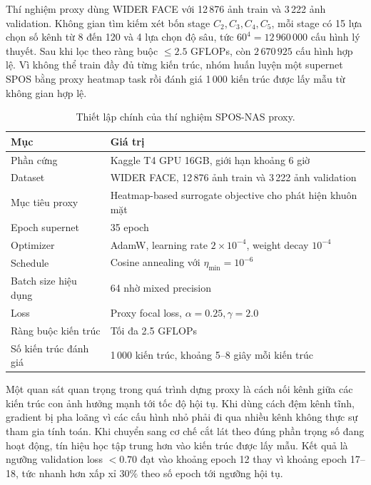 
Thí nghiệm proxy dùng WIDER FACE với 12\,876 ảnh train và 3\,222 ảnh validation. Không gian tìm kiếm xét bốn stage \(C_2,C_3,C_4,C_5\), mỗi stage có 15 lựa chọn số kênh từ 8 đến 120 và 4 lựa chọn độ sâu, tức \(60^4=12\,960\,000\) cấu hình lý thuyết. Sau khi lọc theo ràng buộc \(\leq 2.5\) GFLOPs, còn \(2\,670\,925\) cấu hình hợp lệ. Vì không thể train đầy đủ từng kiến trúc, nhóm huấn luyện một supernet SPOS bằng proxy heatmap task rồi đánh giá 1\,000 kiến trúc được lấy mẫu từ không gian hợp lệ.

\begin{table}[H]
\centering
\caption{Thiết lập chính của thí nghiệm SPOS-NAS proxy.}
\small
\begin{tabular}{@{}p{}p{}@{}}
\toprule
\textbf{Mục} & \textbf{Giá trị} \\
\midrule
Phần cứng & Kaggle T4 GPU 16GB, giới hạn khoảng 6 giờ \\
\midrule
Dataset & WIDER FACE, 12\,876 ảnh train và 3\,222 ảnh validation \\
\midrule
Mục tiêu proxy & Heatmap-based surrogate objective cho phát hiện khuôn mặt \\
\midrule
Epoch supernet & 35 epoch \\
\midrule
Optimizer & AdamW, learning rate \(2\times10^{-4}\), weight decay \(10^{-4}\) \\
\midrule
Schedule & Cosine annealing với \(\eta_{\min}=10^{-6}\) \\
\midrule
Batch size hiệu dụng & 64 nhờ mixed precision \cite{micikevicius2018mixed} \\
\midrule
Loss & Proxy focal loss, \(\alpha=0.25,\gamma=2.0\) \\
\midrule
Ràng buộc kiến trúc & Tối đa 2.5 GFLOPs \\
\midrule
Số kiến trúc đánh giá & 1\,000 kiến trúc, khoảng 5--8 giây mỗi kiến trúc \\
\bottomrule
\end{tabular}
\end{table}

Một quan sát quan trọng trong quá trình dựng proxy là cách nối kênh giữa các kiến trúc con ảnh hưởng mạnh tới tốc độ hội tụ. Khi dùng cách đệm kênh tĩnh, gradient bị pha loãng vì các cấu hình nhỏ phải đi qua nhiều kênh không thực sự tham gia tính toán. Khi chuyển sang cơ chế cắt lát theo đúng phần trọng số đang hoạt động, tín hiệu học tập trung hơn vào kiến trúc được lấy mẫu. Kết quả là ngưỡng validation loss \(<0.70\) đạt vào khoảng epoch 12 thay vì khoảng epoch 17--18, tức nhanh hơn xấp xỉ \(30\%\) theo số epoch tới ngưỡng hội tụ.

